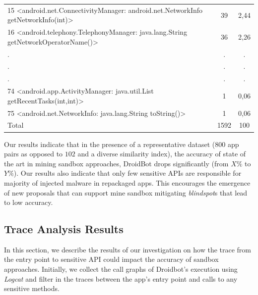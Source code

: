 \begin{table}[t]
\begin{small}
\begin{tabular}{lcc}
   15 <android.net.ConnectivityManager: android.net.NetworkInfo getNetworkInfo(int)> &  39 & 2,44 \\
   16 <android.telephony.TelephonyManager: java.lang.String getNetworkOperatorName()> &  36 & 2,26 \\
   .&  . & . \\
   .&  . & . \\
   .&  . & . \\
   74 <android.app.ActivityManager: java.util.List getRecentTasks(int,int)> & 1 & 0,06 \\
   75 <android.net.NetworkInfo: java.lang.String toString()> & 1 & 0,06 \\

 \bottomrule
                            Total & 1592 & 100 \\

 \end{tabular}
 \end{small}
 \label{tab:APIused}
\end{table}

\begin{obs}{1}{}
   Our results indicate that in the presence of a representative dataset ($800$ app pairs as opposed to $102$ and a diverse similarity index), the accuracy of state of the art in mining sandbox approaches, DroidBot drops significantly (from $X\%$ to $Y\%$). Our results also indicate that only few sensitive APIs are responsible for majority of injected malware in repackaged apps. This encourages the emergence of new proposals that can support mine sandbox mitigating \textit{blindspot}s that lead to low accuracy.
 \end{obs}



\subsection{Trace Analysis Results}\label{sec:traceResults}

In this section, we describe the results of our investigation on how the trace from the entry point to sensitive API could impact the accuracy of sandbox approaches. Initially, we collect the call graphs of Droidbot's execution using \emph{Logcat} and filter in the traces between the app's entry point and calls to any sensitive methods.

